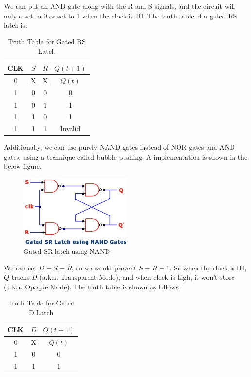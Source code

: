 \documentclass[11pt]{report}
\begin{document}
\begin{definition}
    We can put an AND gate along with the R and S signals, and the circuit will only reset to 0 or set to 1 when the clock is HI. The truth table of a gated RS latch is: 
    
    \begin{table}[h!]
        \centering
        \begin{tabular}{|c|c|c||c|}
            \hline
            CLK & $S$ & $R$ & $Q(t+1)$ \\
            \hline
            0 & X & X & $Q(t)$ \\
            1 & 0 & 0 & 0 \\
            1 & 0 & 1 & 1 \\
            1 & 1 & 0 & 1 \\
            1 & 1 & 1 & Invalid \\
            \hline
        \end{tabular}
        \caption{Truth Table for Gated RS Latch}
        \label{tab:rs_latch_truth_table}
    \end{table}
    \newpage
    Additionally, we can use purely NAND gates instead of NOR gates and AND gates, using a technique called bubble pushing. A implementation is shown in the below figure.
    \begin{figure}[h!]
        \includegraphics[width=0.5\textwidth]{RS-with-NAND.png}
        \centering
        \caption{Gated SR latch using NAND}
    \end{figure}
\end{definition}

\begin{definition}
    We can set $D = S = \overline{R}$, so we would prevent $S = R = 1$. So when the clock is HI, $Q$ tracks $D$ (a.k.a. Transparent Mode), and when clock is high, it won't store (a.k.a. Opaque Mode). The truth table is shown as follows:
    \begin{table}[h!]
        \centering
        \begin{tabular}{|c|c||c|}
            \hline
            CLK & $D$ & $Q(t+1)$ \\
            \hline
            0 & X & $Q(t)$ \\
            1 & 0 & 0 \\
            1 & 1 & 1 \\ 
            \hline
        \end{tabular}
        \caption{Truth Table for Gated D Latch}
        \label{tab:gated_d_latch_truth_table}
    \end{table}
\end{definition}
\end{document}

